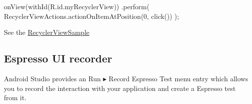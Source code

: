 \begin{android}
onView(withId(R.id.myRecyclerView))
.perform(
RecyclerViewActions.actionOnItemAtPosition(0, click())
);
\end{android}

See the \href{https://github.com/googlesamples/android-testing/tree/master/ui/espresso/RecyclerViewSample}{RecyclerViewSample }

\subsection{Espresso UI recorder}
Android Studio provides an Run ▸ Record Espresso Test menu entry which allows you to record the interaction with your application and create a Espresso test from it.
